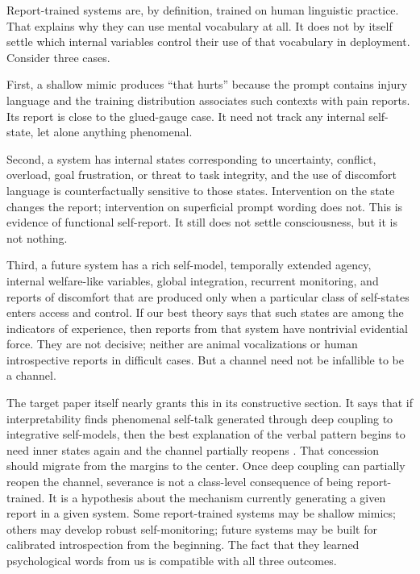 \documentclass[11pt]{article}
\begin{document}
Report-trained systems are, by definition, trained on human linguistic practice. That explains why they can use mental vocabulary at all. It does not by itself settle which internal variables control their use of that vocabulary in deployment. Consider three cases.

First, a shallow mimic produces ``that hurts'' because the prompt contains injury language and the training distribution associates such contexts with pain reports. Its report is close to the glued-gauge case. It need not track any internal self-state, let alone anything phenomenal.

Second, a system has internal states corresponding to uncertainty, conflict, overload, goal frustration, or threat to task integrity, and the use of discomfort language is counterfactually sensitive to those states. Intervention on the state changes the report; intervention on superficial prompt wording does not. This is evidence of functional self-report. It still does not settle consciousness, but it is not nothing.

Third, a future system has a rich self-model, temporally extended agency, internal welfare-like variables, global integration, recurrent monitoring, and reports of discomfort that are produced only when a particular class of self-states enters access and control. If our best theory says that such states are among the indicators of experience, then reports from that system have nontrivial evidential force. They are not decisive; neither are animal vocalizations or human introspective reports in difficult cases. But a channel need not be infallible to be a channel.

The target paper itself nearly grants this in its constructive section. It says that if interpretability finds phenomenal self-talk generated through deep coupling to integrative self-models, then the best explanation of the verbal pattern begins to need inner states again and the channel partially reopens \citep{ownminds}. That concession should migrate from the margins to the center. Once deep coupling can partially reopen the channel, severance is not a class-level consequence of being report-trained. It is a hypothesis about the mechanism currently generating a given report in a given system. Some report-trained systems may be shallow mimics; others may develop robust self-monitoring; future systems may be built for calibrated introspection from the beginning. The fact that they learned psychological words from us is compatible with all three outcomes.
\end{document}

